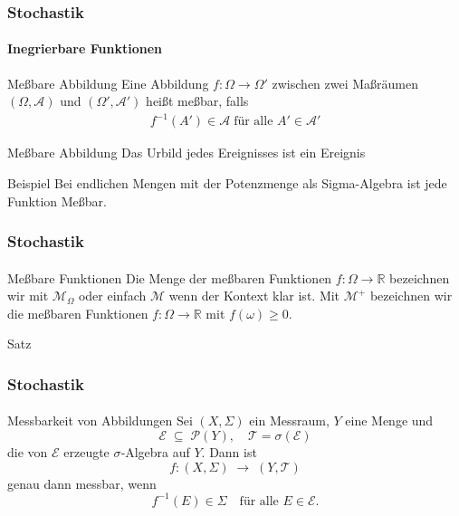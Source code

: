 \documentclass{beamer}
\newcommand{\EE}{\mathcal{E}}
\newcommand{\Tau}{\mathcal{T}}
\begin{document}
  
 \begin{frame}
    \frametitle{Stochastik}
\framesubtitle{Inegrierbare Funktionen}
    \begin{block}{Meßbare Abbildung}
     Eine Abbildung $f:\Omega \to \Omega'$ zwischen zwei Maßräumen 
      $(\Omega, \mathcal{A})$ und $(\Omega', \mathcal{A}')$ heißt meßbar, falls
    \begin{align*}
        f^{-1}(A') \in \mathcal{A} \; \text{für alle } A' \in \mathcal{A}'
    \end{align*}
    \end{block}

    \begin{block}{Meßbare Abbildung}
    Das Urbild jedes Ereignisses ist ein Ereignis
    \end{block}

    \begin{block}{Beispiel}
        Bei endlichen Mengen mit der Potenzmenge als Sigma-Algebra ist jede Funktion Meßbar.
    \end{block}

    
 \end{frame}


\begin{frame}
    \frametitle{Stochastik}
\framesubtitle{}
    \begin{block}{Meßbare Funktionen }
        Die Menge der meßbaren Funktionen $f: \Omega \to \mathbb{R}$ bezeichnen wir mit $\mathcal{M}_\Omega$ oder einfach $\mathcal{M}$
        wenn der Kontext klar ist. 
        Mit $\mathcal{M}^+$ bezeichnen wir die meßbaren Funktionen $f: \Omega \to \mathbb{R}$ mit $f(\omega) \geq 0$. 
    \end{block}

\end{frame}

\begin{frame}{Satz}
    \frametitle{Stochastik}
    \framesubtitle{}
    \begin{block}{Messbarkeit von Abbildungen}
      Sei $(X,\Sigma)$ ein Messraum, $Y$ eine Menge und
      \[
        \EE \;\subseteq\;\mathcal P(Y),
        \quad
        \Tau = \sigma(\EE)
      \]
      die von $\EE$ erzeugte $\sigma$‑Algebra auf $Y$. Dann ist
      \[
        f\colon (X,\Sigma)\;\longrightarrow\;(Y,\Tau)
      \]
      genau dann messbar, wenn
      \[
        f^{-1}(E)\in\Sigma
        \quad\text{für alle }E\in\EE.
      \]
    \end{block}
  \end{frame}
  
\end{document}
